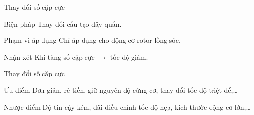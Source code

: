 \documentclass[20pt]{beamer}
\begin{document}
\begin{frame}{Thay đổi số cặp cực}
	\begin{block}{Biện pháp}
		Thay đổi \textcolor{doden}{cấu tạo dây quấn}.
   \end{block}
   
   \begin{block}{Phạm vi áp dụng}
		Chỉ áp dụng cho động cơ \textcolor{doden}{rotor lồng sóc}.
   \end{block}
   
   \begin{block}{Nhận xét}
		Khi \textcolor{doden}{tăng số cặp cực} $\longrightarrow$ \textcolor{doden}{tốc độ giảm}.
   \end{block}
\end{frame}

\begin{frame}{Thay đổi số cặp cực}
	\begin{block}{Ưu điểm}
		\justifying
		Đơn giản, rẻ tiền, giữ nguyên độ cứng cơ, thay đổi tốc độ triệt để,\ldots
   \end{block}
   
   \begin{block}{Nhược điểm}
   		\justifying
		Độ tin cậy kém, dãi điều chỉnh tốc độ hẹp, kích thước động cơ lớn,\ldots
   \end{block}
\end{frame}

\end{document}
